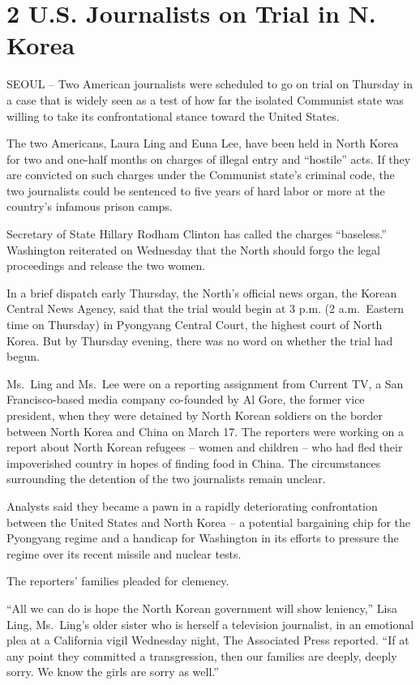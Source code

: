 \documentclass[12pt,a4paper,onecolumn]{article}
\begin{document}
\section{2 U.S. Journalists on Trial in N. Korea}

SEOUL -- Two American journalists were scheduled to go on trial on Thursday in a case that is widely
seen as a test of how far the isolated Communist state was willing to take its confrontational
stance toward the United States.

The two Americans, Laura Ling and Euna Lee, have been held in North Korea for two and one-half
months on charges of illegal entry and ``hostile'' acts. If they are convicted on such charges under
the Communist state's criminal code, the two journalists could be sentenced to five years of hard
labor or more at the country's infamous prison camps.

Secretary of State Hillary Rodham Clinton has called the charges ``baseless.'' Washington reiterated
on Wednesday that the North should forgo the legal proceedings and release the two women.

In a brief dispatch early Thursday, the North's official news organ, the Korean Central News Agency,
said that the trial would begin at 3 p.m. (2 a.m.~Eastern time on Thursday) in Pyongyang Central
Court, the highest court of North Korea. But by Thursday evening, there was no word on whether the
trial had begun.

Ms.~Ling and Ms.~Lee were on a reporting assignment from Current TV, a San Francisco-based media
company co-founded by Al Gore, the former vice president, when they were detained by North Korean
soldiers on the border between North Korea and China on March 17. The reporters were working on a
report about North Korean refugees -- women and children -- who had fled their impoverished country
in hopes of finding food in China. The circumstances surrounding the detention of the two
journalists remain unclear.

Analysts said they became a pawn in a rapidly deteriorating confrontation between the United States
and North Korea -- a potential bargaining chip for the Pyongyang regime and a handicap for
Washington in its efforts to pressure the regime over its recent missile and nuclear tests.

The reporters' families pleaded for clemency.

``All we can do is hope the North Korean government will show leniency,'' Lisa Ling, Ms.~Ling's
older sister who is herself a television journalist, in an emotional plea at a California vigil
Wednesday night, The Associated Press reported. ``If at any point they committed a transgression,
then our families are deeply, deeply sorry. We know the girls are sorry as well.''
\end{document}
